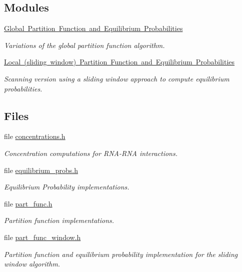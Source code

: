 \subsection*{Modules}
\begin{DoxyCompactItemize}
\item 
\mbox{\hyperlink{group__part__func__global}{Global Partition Function and Equilibrium Probabilities}}
\begin{DoxyCompactList}\small\item\em Variations of the global partition function algorithm. \end{DoxyCompactList}\item 
\mbox{\hyperlink{group__part__func__window}{Local (sliding window) Partition Function and Equilibrium Probabilities}}
\begin{DoxyCompactList}\small\item\em Scanning version using a sliding window approach to compute equilibrium probabilities. \end{DoxyCompactList}\end{DoxyCompactItemize}
\subsection*{Files}
\begin{DoxyCompactItemize}
\item 
file \mbox{\hyperlink{concentrations_8h}{concentrations.\+h}}
\begin{DoxyCompactList}\small\item\em Concentration computations for R\+N\+A-\/\+R\+NA interactions. \end{DoxyCompactList}\item 
file \mbox{\hyperlink{equilibrium__probs_8h}{equilibrium\+\_\+probs.\+h}}
\begin{DoxyCompactList}\small\item\em Equilibrium Probability implementations. \end{DoxyCompactList}\item 
file \mbox{\hyperlink{part__func_8h}{part\+\_\+func.\+h}}
\begin{DoxyCompactList}\small\item\em Partition function implementations. \end{DoxyCompactList}\item 
file \mbox{\hyperlink{part__func__window_8h}{part\+\_\+func\+\_\+window.\+h}}
\begin{DoxyCompactList}\small\item\em Partition function and equilibrium probability implementation for the sliding window algorithm. \end{DoxyCompactList}\end{DoxyCompactItemize}
